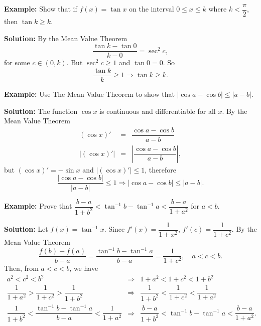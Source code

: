 \documentclass[titlepage,a4paper,12pt]{report}
\begin{document}
\noindent \textbf{Example:} Show that if $f(x)=\tan x$ on the interval $0\leq x\leq k$ where $k<\dfrac{\pi}{2}$, then $\tan k \geq k$.

\noindent \textbf{Solution:} By the Mean Value Theorem
\begin{equation*}
\dfrac{\tan k -\tan 0}{k-0} =\sec ^2 c,
\end{equation*}
 for some $c\in (0,k)$. But $\sec ^2 c \geq 1$ and $\tan 0 =0$. So 
 \begin{equation*}
 \dfrac{\tan k}{k} \geq 1 \Longrightarrow \tan k \geq k.
 \end{equation*}
 
 \noindent \textbf{Example:} Use The Mean Value Theorem to show that $|\cos a -\cos b|\leq |a-b|$.
 
 \noindent \textbf{Solution:} The function $\cos x$ is continuous and differentiable for all $x$. By the Mean Value Theorem
 \begin{eqnarray*}
 (\cos x)' &=& \dfrac{\cos a -\cos b}{a-b}\\
 |(\cos x)'| &=& \left|\dfrac{\cos a -\cos b}{a-b} \right|,
 \end{eqnarray*}
 but $(\cos x)'=-\sin x$ and $|(\cos x)'|\leq 1$, therefore
 \begin{equation*}
 \dfrac{|\cos a -\cos b|}{|a-b|}\leq 1 \Longrightarrow |\cos a -\cos b|\leq |a-b|.
 \end{equation*}
 
 \noindent \textbf{Example:} Prove that $\dfrac{b-a}{1+b^2}<\tan ^{-1} b -\tan ^{-1} a < \dfrac{b-a}{1+a^2}$ for $a<b$.
 
 \noindent \textbf{Solution:} Let $f(x)=\tan ^{-1} x $. Since $f'(x)=\dfrac{1}{1+x^2}, \,f'(c)=\dfrac{1}{1+c^2} $. By the Mean Value Theorem
 \begin{equation*}
 \dfrac{f(b)-f(a)}{b-a}=\dfrac{\tan ^{-1} b-\tan ^{-1} a}{b-a} =\dfrac{1}{1+c^2}, \quad a<c<b.
 \end{equation*}
 Then, from $a<c<b$, we have 
 \begin{eqnarray*}
 a^2<c^2<b^2 &\Longrightarrow& 1+a^2<1+c^2<1+b^2\\
 \dfrac{1}{1+a^2}>\dfrac{1}{1+c^2}>\dfrac{1}{1+b^2} &\Longrightarrow &  \dfrac{1}{1+b^2}<\dfrac{1}{1+c^2}<\dfrac{1}{1+a^2}\\
 \dfrac{1}{1+b^2}<\dfrac{\tan ^{-1} b -\tan ^{-1} a}{b-a} <\dfrac{1}{1+a^2} &\Longrightarrow & \dfrac{b-a}{1+b^2}<\tan ^{-1} b -\tan ^{-1} a < \dfrac{b-a}{1+a^2}.
 \end{eqnarray*}
 
\end{document}

